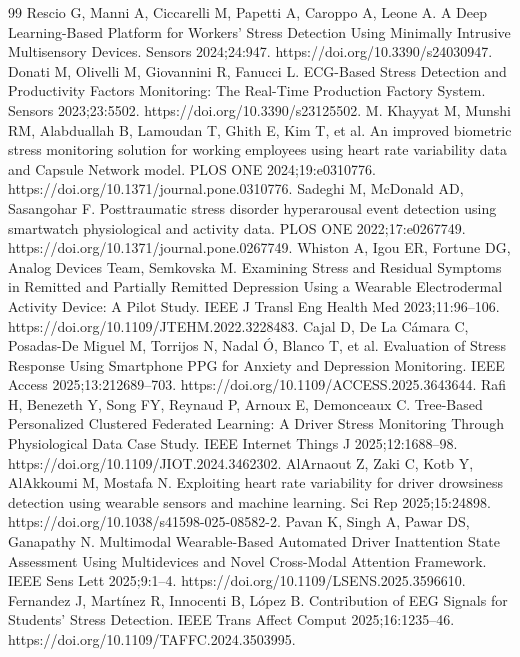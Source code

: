 \documentclass[11pt,a4paper]{article}
\begin{document}
\renewcommand{\refname}{References}
\begin{thebibliography}{99}
\setlength{\itemsep}{1.5pt}\small
{} Rescio G, Manni A, Ciccarelli M, Papetti A, Caroppo A, Leone A. A Deep Learning-Based Platform for Workers’ Stress Detection Using Minimally Intrusive Multisensory Devices. Sensors 2024;24:947. https://doi.org/10.3390/s24030947.
 Donati M, Olivelli M, Giovannini R, Fanucci L. ECG-Based Stress Detection and Productivity Factors Monitoring: The Real-Time Production Factory System. Sensors 2023;23:5502. https://doi.org/10.3390/s23125502.
 M. Khayyat M, Munshi RM, Alabduallah B, Lamoudan T, Ghith E, Kim T, et al. An improved biometric stress monitoring solution for working employees using heart rate variability data and Capsule Network model. PLOS ONE 2024;19:e0310776. https://doi.org/10.1371/journal.pone.0310776.
 Sadeghi M, McDonald AD, Sasangohar F. Posttraumatic stress disorder hyperarousal event detection using smartwatch physiological and activity data. PLOS ONE 2022;17:e0267749. https://doi.org/10.1371/journal.pone.0267749.
 Whiston A, Igou ER, Fortune DG, Analog Devices Team, Semkovska M. Examining Stress and Residual Symptoms in Remitted and Partially Remitted Depression Using a Wearable Electrodermal Activity Device: A Pilot Study. IEEE J Transl Eng Health Med 2023;11:96--106. https://doi.org/10.1109/JTEHM.2022.3228483.
 Cajal D, De La Cámara C, Posadas-De Miguel M, Torrijos N, Nadal Ó, Blanco T, et al. Evaluation of Stress Response Using Smartphone PPG for Anxiety and Depression Monitoring. IEEE Access 2025;13:212689--703. https://doi.org/10.1109/ACCESS.2025.3643644.
 Rafi H, Benezeth Y, Song FY, Reynaud P, Arnoux E, Demonceaux C. Tree-Based Personalized Clustered Federated Learning: A Driver Stress Monitoring Through Physiological Data Case Study. IEEE Internet Things J 2025;12:1688--98. https://doi.org/10.1109/JIOT.2024.3462302.
 AlArnaout Z, Zaki C, Kotb Y, AlAkkoumi M, Mostafa N. Exploiting heart rate variability for driver drowsiness detection using wearable sensors and machine learning. Sci Rep 2025;15:24898. https://doi.org/10.1038/s41598-025-08582-2.
 Pavan K, Singh A, Pawar DS, Ganapathy N. Multimodal Wearable-Based Automated Driver Inattention State Assessment Using Multidevices and Novel Cross-Modal Attention Framework. IEEE Sens Lett 2025;9:1--4. https://doi.org/10.1109/LSENS.2025.3596610.
 Fernandez J, Martínez R, Innocenti B, López B. Contribution of EEG Signals for Students’ Stress Detection. IEEE Trans Affect Comput 2025;16:1235--46. https://doi.org/10.1109/TAFFC.2024.3503995.

\end{thebibliography}
\end{document}
